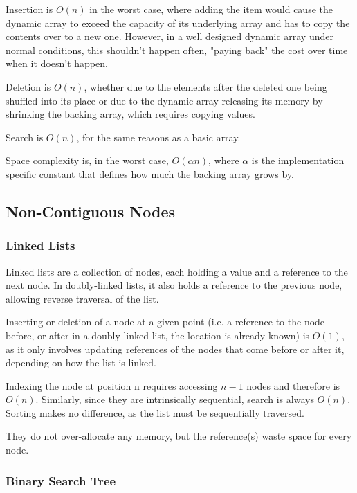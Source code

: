 \documentclass[]{article}
\begin{document}
Insertion is $O(n)$ in the worst case, where adding the item would cause the dynamic array to exceed the capacity of its underlying array and has to copy the contents over to a new one. However, in a well designed dynamic array under normal conditions, this shouldn't happen often, "paying back" the cost over time when it doesn't happen.

Deletion is $O(n)$, whether due to the elements after the deleted one being shuffled into its place or due to the dynamic array releasing its memory by shrinking the backing array, which requires copying values.

Search is $O(n)$, for the same reasons as a basic array.

Space complexity is, in the worst case, $O(\alpha n)$, where $\alpha$ is the implementation specific constant that defines how much the backing array grows by.

\pagebreak

\subsection{Non-Contiguous Nodes}

\subsubsection{Linked Lists}

Linked lists are a collection of nodes, each holding a value and a reference to the next node. In doubly-linked lists, it also holds a reference to the previous node, allowing reverse traversal of the list.

Inserting or deletion of a node at a given point (i.e. a reference to the node before, or after in a doubly-linked list, the location is already known) is $O(1)$, as it only involves updating references of the nodes that come before or after it, depending on how the list is linked.

Indexing the node at position n requires accessing $n-1$ nodes and therefore is $O(n)$. Similarly, since they are intrinsically sequential, search is always $O(n)$. Sorting makes no difference, as the list must be sequentially traversed.

They do not over-allocate any memory, but the reference(s) waste space for every node.

\subsubsection{Binary Search Tree}
\end{document}

